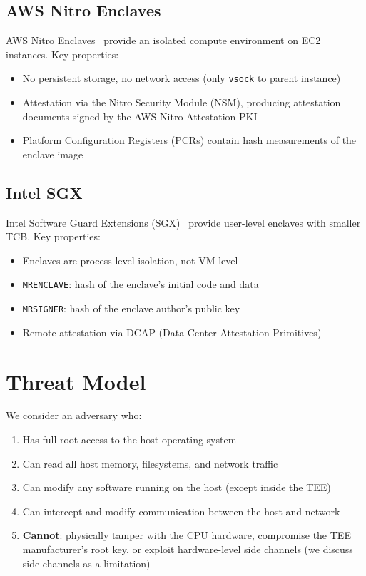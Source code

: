 \documentclass[conference]{IEEEtran}
\begin{document}
\subsection{AWS Nitro Enclaves}

AWS Nitro Enclaves~\cite{nitro2020} provide an isolated compute environment on EC2 instances. Key properties:
\begin{itemize}
    \item No persistent storage, no network access (only \texttt{vsock} to parent instance)
    \item Attestation via the Nitro Security Module (NSM), producing attestation documents signed by the AWS Nitro Attestation PKI
    \item Platform Configuration Registers (PCRs) contain hash measurements of the enclave image
\end{itemize}

\subsection{Intel SGX}

Intel Software Guard Extensions (SGX)~\cite{mckeen2013} provide user-level enclaves with smaller TCB. Key properties:
\begin{itemize}
    \item Enclaves are process-level isolation, not VM-level
    \item \texttt{MRENCLAVE}: hash of the enclave's initial code and data
    \item \texttt{MRSIGNER}: hash of the enclave author's public key
    \item Remote attestation via DCAP (Data Center Attestation Primitives)
\end{itemize}

\section{Threat Model}

We consider an adversary who:
\begin{enumerate}
    \item Has full root access to the host operating system
    \item Can read all host memory, filesystems, and network traffic
    \item Can modify any software running on the host (except inside the TEE)
    \item Can intercept and modify communication between the host and network
    \item \textbf{Cannot}: physically tamper with the CPU hardware, compromise the TEE manufacturer's root key, or exploit hardware-level side channels (we discuss side channels as a limitation)
\end{enumerate}
\end{document}
